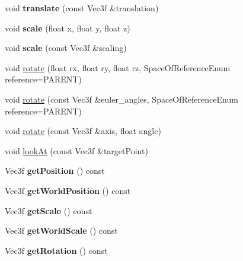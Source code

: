 \begin{DoxyCompactItemize}
\item 
\hypertarget{class_transform_a707167a0cf2b279459b7b17a5e8270aa}{
void {\bfseries translate} (const Vec3f \&translation)}
\label{class_transform_a707167a0cf2b279459b7b17a5e8270aa}

\item 
\hypertarget{class_transform_a56f65b9bab2981aa800d3559823ad1b7}{
void {\bfseries scale} (float x, float y, float z)}
\label{class_transform_a56f65b9bab2981aa800d3559823ad1b7}

\item 
\hypertarget{class_transform_a1e0ef8fc5f8a4c84f0f4b13b39e250cc}{
void {\bfseries scale} (const Vec3f \&scaling)}
\label{class_transform_a1e0ef8fc5f8a4c84f0f4b13b39e250cc}

\item 
void \hyperlink{class_transform_a49da2af362feeaf653e09216d2e67314}{rotate} (float rx, float ry, float rz, SpaceOfReferenceEnum reference=PARENT)
\item 
void \hyperlink{class_transform_ae5b4cdd5d9cf3e8c3ef67907fd1663c2}{rotate} (const Vec3f \&euler\_\-angles, SpaceOfReferenceEnum reference=PARENT)
\item 
void \hyperlink{class_transform_ab8ab1268af903a4302825dc44f567446}{rotate} (const Vec3f \&axis, float angle)
\item 
void \hyperlink{class_transform_a559d420570aded5e0a5db372dfd7f4fa}{lookAt} (const Vec3f \&targetPoint)
\item 
\hypertarget{class_transform_abb87ba961251c18c7964cf9dd50923fa}{
Vec3f {\bfseries getPosition} () const }
\label{class_transform_abb87ba961251c18c7964cf9dd50923fa}

\item 
\hypertarget{class_transform_a7f91e85beafc56a5da3c53b31d7e5eb2}{
Vec3f {\bfseries getWorldPosition} () const }
\label{class_transform_a7f91e85beafc56a5da3c53b31d7e5eb2}

\item 
\hypertarget{class_transform_a35628a3c05902445ad155de45418e1cb}{
Vec3f {\bfseries getScale} () const }
\label{class_transform_a35628a3c05902445ad155de45418e1cb}

\item 
\hypertarget{class_transform_adfedc5e72afe00288d1bf84939e1f09b}{
Vec3f {\bfseries getWorldScale} () const }
\label{class_transform_adfedc5e72afe00288d1bf84939e1f09b}

\item 
\hypertarget{class_transform_ad941bc86b36ad61fad7dd24389e443f3}{
Vec3f {\bfseries getRotation} () const }
\label{class_transform_ad941bc86b36ad61fad7dd24389e443f3}


\end{DoxyCompactItemize}
